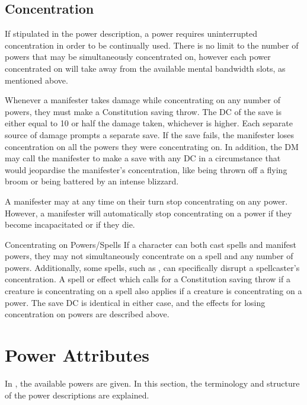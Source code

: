 \subsection{Concentration}
\label{sub:concentration}
If stipulated in the power description,
a power requires uninterrupted concentration
in order to be continually used.
There is no limit to the number of powers that may be
simultaneously concentrated on,
however each power concentrated on will take away from the
available mental bandwidth slots, as mentioned above.

Whenever a manifester takes damage while
concentrating on any number of powers,
they must make a Constitution saving throw.
The DC of the save is either equal to 10 or half the damage taken,
whichever is higher.
Each separate source of damage prompts a separate save.
If the save fails,
the manifester loses concentration on all the powers they were
concentrating on.
In addition, the DM may call the manifester to make a
save with any DC in a circumstance that would
jeopardise the manifester's concentration,
like being thrown off a flying broom or
being battered by an intense blizzard.

A manifester may at any time on their turn
stop concentrating on any power.
However, a manifester will automatically stop concentrating on a power
if they become incapacitated or if they die.

\begin{DndSidebar}[float=htbp]{Concentrating on Powers/Spells}
    If a character
    can both cast spells and manifest powers,
    they may not simultaneously concentrate on a spell
    and any number of powers.
    Additionally, some spells, such as ,
    can specifically disrupt a spellcaster's concentration.
    A spell or effect which calls for a Constitution saving throw
    if a creature is concentrating on a spell
    also applies if a creature is concentrating on a power.
    The save DC is identical in either case,
    and the effects for losing concentration on powers
    are described above.
\end{DndSidebar}

\section{Power Attributes}
\label{sec:power_attributes}
In ,
the available powers are given.
In this section,
the terminology and structure of the power descriptions are explained.

